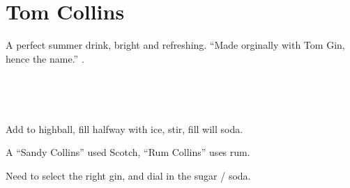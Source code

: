 \section[Tom Collins]{Tom Collins}

\begin{recipestats}[
        servings=1,
        preptime=5 \minute,
        source=Mike \& Jane,
        original=\citefield{heresHow1941}{title} \cite{heresHow1941},
    ]
\end{recipestats}

\begin{recipeabstract}
    A perfect summer drink, bright and refreshing.
    ``Made orginally with Tom Gin, hence the name.'' \cite{heresHow1941}.
\end{recipeabstract}

\begin{ingredientcolumns}
    \begin{ingredientblock}
        \\
    \end{ingredientblock}
    \begin{ingredientblock}
        \\
    \end{ingredientblock}
\end{ingredientcolumns}

\begin{preparation}
\item Add to highball, fill halfway with ice, stir, fill will soda.
\end{preparation}

\begin{variation}
\item A ``Sandy Collins'' used Scotch, ``Rum Collins'' uses rum.
\end{variation}

\begin{experiments}
\item Need to select the right gin, and dial in the sugar / soda.
\end{experiments}

\recipeend
